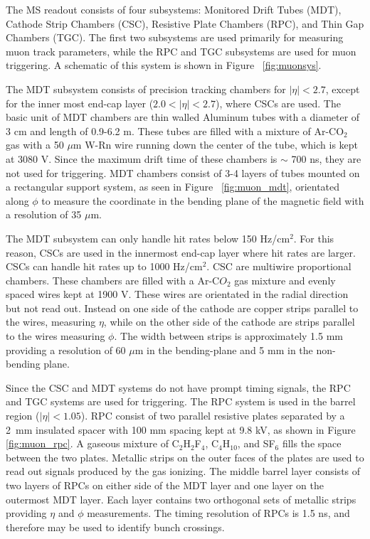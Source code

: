 The MS readout consists of four subsystems: Monitored Drift Tubes (MDT), Cathode Strip Chambers (CSC), Resistive Plate Chambers (RPC), and Thin Gap Chambers (TGC). The first two subsystems are used primarily for measuring muon track parameters, while the RPC and TGC subsystems are used for muon triggering. A schematic of this system is shown in Figure ~\ref{fig:muonsys}. 

The MDT subsystem consists of precision tracking chambers for $|\eta|<2.7$, except for the inner most end-cap layer ($2.0 < |\eta| < 2.7$), where CSCs are used. The basic unit of MDT chambers are thin walled Aluminum tubes with a diameter of 3 cm and length of 0.9-6.2 m. These tubes are filled with a mixture of Ar-CO$_{2}$ gas with a  50 $\mu$m W-Rn wire running down the center of the tube, which is kept at 3080 V. Since the maximum drift time of these chambers is $\sim$ 700 ns, they are not used for triggering. MDT chambers consist of 3-4 layers of tubes mounted on a rectangular support system, as seen in Figure ~\ref{fig:muon_mdt}, orientated along $\phi$ to measure the coordinate in the bending plane of the magnetic field with a resolution of 35 $\mu$m.

The MDT subsystem can only handle hit rates below 150 Hz/cm$^{2}$. For this reason, CSCs are used in the innermost end-cap layer where hit rates are larger. CSCs can handle hit rates up to 1000 Hz/cm$^{2}$. CSC are multiwire proportional chambers. These chambers are filled with a Ar-C$O_{2}$ gas mixture and evenly spaced wires kept at 1900 V. These wires are orientated in the radial direction but not read out. Instead on one side of the cathode are copper strips parallel to the wires, measuring $\eta$, while on the other side of the cathode are strips parallel to the wires measuring $\phi$. The width between strips is approximately 1.5 mm providing a resolution of 60 $\mu$m in the bending-plane and 5 mm in the non-bending plane. 

Since the CSC and MDT systems do not have prompt timing signals, the RPC and TGC systems are used for triggering. The RPC system is used in the barrel region ($|\eta| < 1.05$). RPC consist of two parallel resistive plates separated by a 2~mm insulated spacer with 100 mm spacing kept at 9.8 kV, as shown in Figure \ref{fig:muon_rpc}. A gaseous mixture of C$_{2}$H$_{2}$F$_{4}$, C$_{4}$H$_{10}$, and SF$_{6}$ fills the space between the two plates. Metallic strips on the outer faces of the plates are used to read out signals produced by the gas ionizing. The middle barrel layer consists of two layers of RPCs on either side of the MDT layer and one layer on the outermost MDT layer. Each layer contains two orthogonal sets of metallic strips providing $\eta$ and $\phi$ measurements. The timing resolution of RPCs is 1.5 ns, and therefore may be used to identify bunch crossings. 


